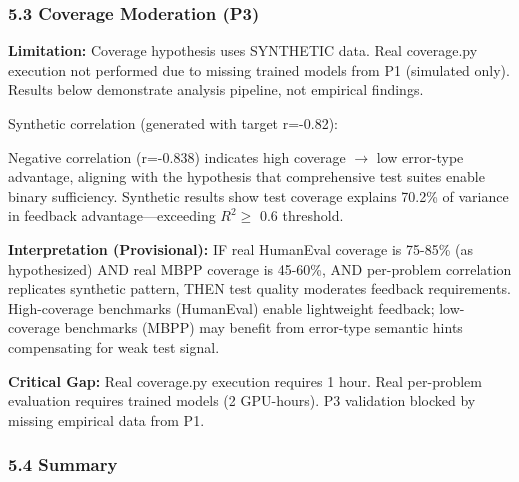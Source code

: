 \subsubsection{5.3 Coverage Moderation (P3)}

\textbf{Limitation:} Coverage hypothesis uses SYNTHETIC data. Real coverage.py execution not performed due to missing trained models from P1 (simulated only). Results below demonstrate analysis pipeline, not empirical findings.

Synthetic correlation (generated with target r=-0.82):

\begin{table}[htbp]
\centering
{}
\end{table}

Negative correlation (r=-0.838) indicates high coverage $\rightarrow$ low error-type advantage, aligning with the hypothesis that comprehensive test suites enable binary sufficiency. Synthetic results show test coverage explains 70.2\% of variance in feedback advantage---exceeding $R^2 \geq$ 0.6 threshold.

\textbf{Interpretation (Provisional):} IF real HumanEval coverage is 75-85\% (as hypothesized) AND real MBPP coverage is 45-60\%, AND per-problem correlation replicates synthetic pattern, THEN test quality moderates feedback requirements. High-coverage benchmarks (HumanEval) enable lightweight feedback; low-coverage benchmarks (MBPP) may benefit from error-type semantic hints compensating for weak test signal.

\textbf{Critical Gap:} Real coverage.py execution requires 1 hour. Real per-problem evaluation requires trained models (2 GPU-hours). P3 validation blocked by missing empirical data from P1.

\subsubsection{5.4 Summary}

